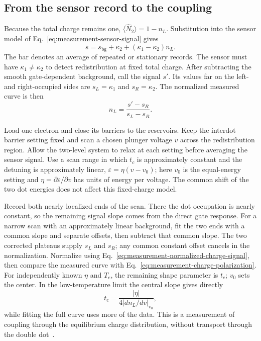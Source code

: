 \subsection{From the sensor record to the coupling}
Because the total charge remains one,
$\langle\widehat N_2\rangle=1-n_L$. Substitution into the
sensor model of Eq.~\eqref{eq:measurement-sensor-signal} gives
\begin{equation}
 \overline s=s_{\mathrm{bg}}+\kappa_2
                         +(\kappa_1-\kappa_2)n_L.
 \label{eq:measurement-interdot-sensor-signal}
\end{equation}
The bar denotes an average of repeated or stationary records.
The sensor must have $\kappa_1\ne\kappa_2$ to detect redistribution
at fixed total charge. After subtracting the smooth gate-dependent
background, call the signal $s'$. Its values far on the left- and
right-occupied sides are $s_L=\kappa_1$ and $s_R=\kappa_2$.
The normalized measured curve is then
\begin{equation}
 n_L=\frac{s'-s_R}{s_L-s_R}.
 \label{eq:measurement-normalized-charge-signal}
\end{equation}

Load one electron and close its barriers to the reservoirs.
Keep the interdot barrier setting fixed and scan a chosen plunger
voltage $v$ across the redistribution region. Allow the two-level
system to relax at each setting before averaging the sensor signal.
Use a scan range in which $t_c$ is approximately constant and
the detuning is approximately linear,
$\varepsilon=\eta(v-v_0)$; here $v_0$ is the equal-energy setting
and $\eta=\partial\varepsilon/\partial v$ has units of energy
per voltage. The common shift of the two dot energies does not
affect this fixed-charge model.

Record both nearly localized ends of the scan. There the dot
occupation is nearly constant, so the remaining signal slope
comes from the direct gate response. For a narrow scan with an
approximately linear background, fit the two ends with a common
slope and separate offsets, then subtract that common slope.
The two corrected plateaus supply $s_L$ and $s_R$; any common
constant offset cancels in the normalization. Normalize using
Eq.~\eqref{eq:measurement-normalized-charge-signal}, then compare
the measured curve with Eq.~\eqref{eq:measurement-charge-polarization}.
For independently known $\eta$ and $T_e$, the remaining shape
parameter is $t_c$; $v_0$ sets the center. In the low-temperature
limit the central slope gives directly
\[
 t_c=\frac{|\eta|}{4|dn_L/dv|_{v_0}},
\]
while fitting the full curve uses more of the data. This is a
measurement of coupling through the equilibrium charge distribution,
without transport through the double dot~\cite{DiCarlo2004}.

